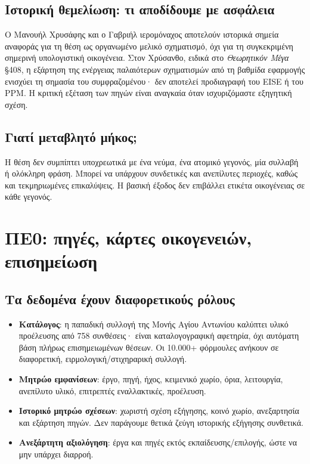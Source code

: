 \documentclass[11pt,a4paper]{extarticle}
\begin{document}
\subsection*{Ιστορική θεμελίωση: τι αποδίδουμε με ασφάλεια}
Ο Μανουήλ Χρυσάφης και ο Γαβριήλ ιερομόναχος αποτελούν ιστορικά σημεία αναφοράς για τη θέση ως οργανωμένο μελικό σχηματισμό, όχι για τη συγκεκριμένη σημερινή υπολογιστική οικογένεια. Στον Χρύσανθο, ειδικά στο \emph{Θεωρητικόν Μέγα} §408, η εξάρτηση της ενέργειας παλαιότερων σχηματισμών από τη βαθμίδα εφαρμογής ενισχύει τη σημασία του συμφραζομένου· δεν αποτελεί προδιαγραφή του EISE ή του PPM. Η κριτική εξέταση των πηγών είναι αναγκαία όταν ισχυριζόμαστε εξηγητική σχέση.

\subsection*{Γιατί μεταβλητό μήκος;}
Η θέση δεν συμπίπτει υποχρεωτικά με ένα νεύμα, ένα ατομικό γεγονός, μία συλλαβή ή ολόκληρη φράση. Μπορεί να υπάρχουν συνδετικές και ανεπίλυτες περιοχές, καθώς και τεκμηριωμένες επικαλύψεις. Η βασική έξοδος δεν επιβάλλει ετικέτα οικογένειας σε κάθε γεγονός.




\section{ΠΕ0: πηγές, κάρτες οικογενειών, επισημείωση}
\subsection*{Τα δεδομένα έχουν διαφορετικούς ρόλους}
\begin{itemize}
\item \textbf{Κατάλογος}: η παπαδική συλλογή της Μονής Αγίου Αντωνίου καλύπτει υλικό προέλευσης από 758 συνθέσεις· είναι καταλογογραφική αφετηρία, όχι αυτόματη βάση πλήρως επισημειωμένων θέσεων. Οι 10.000+ φόρμουλες ανήκουν σε διαφορετική, ειρμολογική/στιχηραρική συλλογή.
\item \textbf{Μητρώο εμφανίσεων}: έργο, πηγή, ήχος, κειμενικό χωρίο, όρια, λειτουργία, ανεπίλυτο υλικό, επιτρεπτές εναλλακτικές, προέλευση.
\item \textbf{Ιστορικό μητρώο σχέσεων}: χωριστή σχέση εξήγησης, κοινό χωρίο, ανεξαρτησία και εξάρτηση πηγών. Δεν παράγουμε θετικά ζεύγη ιστορικής εξήγησης συνθετικά.
\item \textbf{Ανεξάρτητη αξιολόγηση}: έργα και πηγές εκτός εκπαίδευσης/επιλογής, ώστε να μην υπάρχει διαρροή.
\end{itemize}
\end{document}
